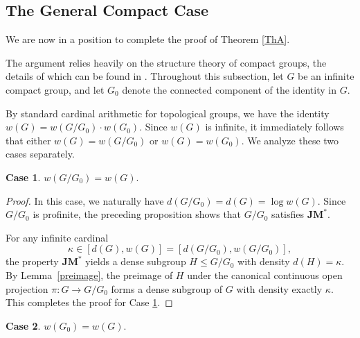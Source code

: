 \documentclass[12pt]{amsart}
\theoremstyle{definition}
\newtheorem{case}{Case}
\numberwithin{equation}{section}
\theoremstyle{remark}
\def\JM{\mathbf{JM}}
\begin{document}
\subsection{The General Compact Case}

We are now in a position to complete the proof of Theorem \ref{ThA}. 

The argument relies heavily on the structure theory of compact groups, the details of which can be found in \cite[Ch.~9]{HM}. 
Throughout this subsection, let $G$ be an infinite compact group, and let $G_0$ denote the connected component of the identity in $G$.

By standard cardinal arithmetic for topological groups, we have the identity $w(G) = w(G/G_0) \cdot w(G_0)$. Since $w(G)$ is infinite, it immediately follows that either $w(G) = w(G/G_0)$ or $w(G) = w(G_0)$. We analyze these two cases separately.

\begin{case}\label{case1}
$w(G/G_0) = w(G)$.
\end{case}

\begin{proof}
In this case, we naturally have $d(G/G_0) = d(G) = \log w(G)$. 
 Since $G/G_0$ is profinite, the preceding proposition shows that $G/G_0$ satisfies $\JM^*$.

For any infinite cardinal
\[
\kappa \in [d(G), w(G)] = [d(G/G_0), w(G/G_0)],
\]
the property $\JM^*$ yields a dense subgroup $H \leq G/G_0$ with density $d(H) = \kappa$. 
By Lemma~\ref{preimage}, the preimage of $H$ under the canonical continuous open projection $\pi: G \to G/G_0$ forms a dense subgroup of $G$ with density exactly $\kappa$. This completes the proof for Case \ref{case1}.
\end{proof}

\begin{case}\label{case2}
$w(G_0) = w(G)$.
\end{case}
\end{document}
